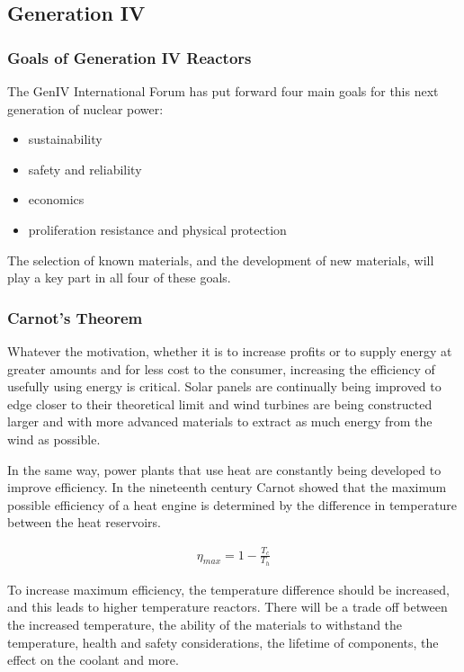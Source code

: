 \subsection{Generation IV}

\subsubsection{Goals of Generation IV Reactors}

The GenIV International Forum has put forward four main goals for this next generation of nuclear power\cite{genivgif}:

\begin{itemize}
\item sustainability
\item safety and reliability
\item economics
\item proliferation resistance and physical protection
\end{itemize}

The selection of known materials, and the development of new materials, will play a key part in all four of these goals.


\subsubsection{Carnot's Theorem}
\label{section:carnottheorem}

Whatever the motivation, whether it is to increase profits or to supply energy at greater amounts and for less cost to the consumer, increasing the efficiency of usefully using energy is critical.  Solar panels are continually being improved to edge closer to their theoretical limit and wind turbines are being constructed larger and with more advanced materials to extract as much energy from the wind as possible.

In the same way, power plants that use heat are constantly being developed to improve efficiency.  In the nineteenth century Carnot showed that the maximum possible efficiency of a heat engine is determined by the difference in temperature between the heat reservoirs.\cite{carnottheorem}

\begin{equation}
\begin{split}
\eta_{max} = 1 - \frac{T_c}{T_h}
\end{split}
\end{equation}

To increase maximum efficiency, the temperature difference should be increased, and this leads to higher temperature reactors.  There will be a trade off between the increased temperature, the ability of the materials to withstand the temperature, health and safety considerations, the lifetime of components, the effect on the coolant and more.

